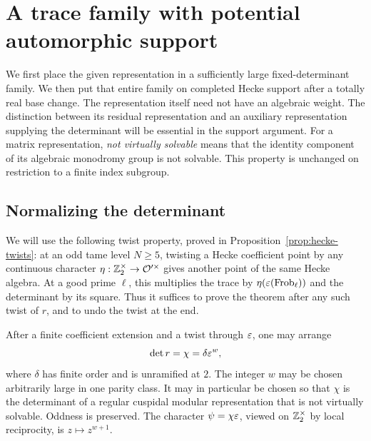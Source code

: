 \section{A trace family with potential automorphic support}
\label{sec:family}

We first place the given representation in a sufficiently large
fixed-determinant family.  We then put that entire family on completed
Hecke support after a totally real base change.  The representation
itself need not have an algebraic weight.  The distinction between its
residual representation and an auxiliary representation supplying the
determinant will be essential in the support argument.  For a matrix
representation, \emph{not virtually solvable} means that the identity
component of its algebraic monodromy group is not solvable.  This
property is unchanged on restriction to a finite index subgroup.

\subsection{Normalizing the determinant}

We will use the following twist property, proved in
Proposition~\ref{prop:hecke-twists}: at an odd tame level $N\geq5$, twisting
a Hecke coefficient point by any continuous character
$\eta:\mathbb Z_2^\times\to\mathcal O'^\times$ gives another point of the same
Hecke algebra.  At a good prime $\ell$, this multiplies the trace by
$\eta(\varepsilon(\operatorname{Frob}_\ell))$ and the determinant by its
square.  Thus it suffices to prove the theorem after any such twist
of $r$, and to undo the twist at the end.

\begin{lemma}\label{lem:normalization}
After a finite coefficient extension and a twist through $\varepsilon$, one
may arrange
\[
 \det r=\chi=\delta\varepsilon^w,
\]
where $\delta$ has finite order and is unramified at $2$.  The integer
$w$ may be chosen arbitrarily large in one parity class.  It may in
particular be chosen so that $\chi$ is the determinant of a regular
cuspidal modular representation that is not virtually solvable.
Oddness is preserved.  The character $\psi=\chi\varepsilon$, viewed on
$\mathbb Z_2^\times$ by local reciprocity, is $z\mapsto z^{w+1}$.
\end{lemma}

